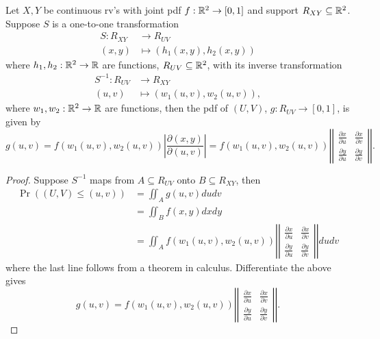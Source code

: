 \documentclass[11pt,fleqn]{book} %
\begin{document}
\begin{theorem} \label{thm:325}
Let \(X, Y\) be continuous rv's with joint pdf \(f:\mathbb{R}^2\rightarrow[0, 1]\) and support \(R_{XY} \subseteq \mathbb{R}^2\). Suppose \(S\) is a one-to-one transformation
\[
\begin{aligned}
S: R_{XY} &\rightarrow R_{UV} \\
(x,y) &\mapsto (h_1(x, y), h_2(x, y)) 
\end{aligned}
\]
where \(h_1, h_2: \mathbb{R}^2\rightarrow\mathbb{R}\) are functions, \(R_{UV} \subseteq \mathbb{R}^2\), with its inverse transformation
\[
\begin{aligned}
S^{-1}: R_{UV} &\rightarrow R_{XY} \\
(u, v) &\mapsto (w_1(u, v), w_2(u, v)),
\end{aligned}
\]
where \(w_1, w_2:\mathbb{R}^2\rightarrow\mathbb{R}\) are functions, then the pdf of \((U, V)\), \(g: R_{UV} \rightarrow [0, 1]\), is given by
\[
g(u, v) = f(w_1(u, v), w_2(u, v))\left|\frac{\partial(x, y)}{\partial(u, v)}\right| = f(w_1(u, v), w_2(u, v))\left|\left|\begin{smallmatrix} \frac{\partial x}{\partial u} & \frac{\partial x}{\partial v} \\
\frac{\partial y}{\partial u} & \frac{\partial y}{\partial v}
\end{smallmatrix}
\right|\right|.
\]
\end{theorem}
\begin{proof} Suppose \(S^{-1}\) maps from \(A \subseteq R_{UV}\) onto \(B \subseteq R_{XY}\), then
\[
\begin{aligned}
\Pr((U, V) \leq (u, v)) &= \iint_A g(u, v)dudv \\
&= \iint_B f(x, y)dxdy \\
&= \iint_A f(w_1(u, v), w_2(u, v))\left|\left|\begin{smallmatrix} \frac{\partial x}{\partial u} & \frac{\partial x}{\partial v} \\
\frac{\partial y}{\partial u} & \frac{\partial y}{\partial v}
\end{smallmatrix}
\right|\right|dudv
\end{aligned}
\]
where the last line follows from a theorem in calculus. Differentiate the above gives
\[
g(u, v) = f(w_1(u, v), w_2(u, v)) \left|\left|\begin{smallmatrix} \frac{\partial x}{\partial u} & \frac{\partial x}{\partial v} \\
\frac{\partial y}{\partial u} & \frac{\partial y}{\partial v}
\end{smallmatrix}
\right|\right|.
\]
\end{proof}
\end{document}
